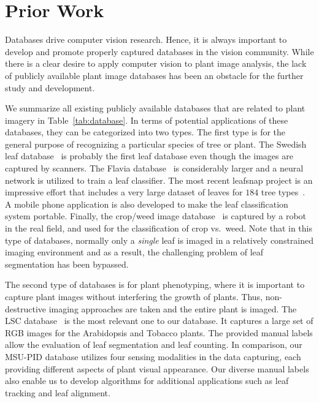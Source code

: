 \section{Prior Work}
\label{sec:prior}

Databases drive computer vision research. 
Hence, it is always important to develop and promote properly captured databases in the vision community. 
While there is a clear desire to apply computer vision to plant image analysis, the lack of publicly available plant image databases has been an obstacle for the further study and development.

We summarize all existing publicly available databases that are related to plant imagery in Table~\ref{tab:database}. In terms of potential applications of these databases, they can be categorized into two types. 
The first type is for the general purpose of recognizing a particular species of tree or plant. 
The Swedish leaf database~\cite{soderkvist2001computer} is probably the first leaf database even though the images are captured by scanners. 
The Flavia database~\cite{wu2007leaf} is considerably larger and a neural network is utilized to train a leaf classifier. 
The most recent leafsnap project is an impressive effort that includes a very large dataset of leaves for $184$ tree types~\cite{kumar2012leafsnap}. 
A mobile phone application is also developed to make the leaf classification system portable. Finally, the crop/weed image database~\cite{haug2014crop} is captured by a robot in the real field, and used for the classification of crop vs.~weed. 
Note that in this type of databases, normally only a {\it single} leaf is imaged in a relatively constrained imaging environment and as a result, the challenging problem of leaf segmentation has been bypassed.

The second type of databases is for plant phenotyping, where it is important to capture plant images without interfering the growth of plants. 
Thus, non-destructive imaging approaches are taken and the entire plant is imaged. The LSC database~\cite{scharr2014annotated} is the most relevant one to our database. It captures a large set of RGB images for the Arabidopsis and Tobacco plants. The provided manual labels allow the evaluation of leaf segmentation and leaf counting. In comparison, our MSU-PID database utilizes four sensing modalities in the data capturing, each providing different aspects of plant visual appearance.
Our diverse manual labels also enable us to develop algorithms for additional applications such as leaf tracking and leaf alignment.
